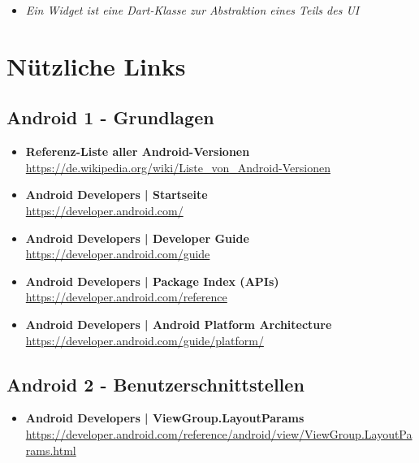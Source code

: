 \documentclass[a4paper]{article}
\begin{document}
{\begin{itemize}
		\item \textit{Ein Widget ist eine Dart-Klasse zur Abstraktion eines Teils des UI}
		
	\end{itemize}
\newpage
	
\section{Nützliche Links}

	\subsection{Android 1 - Grundlagen}
	
	\begin{itemize}
		\item \textbf{Referenz-Liste aller Android-Versionen}\\
		\href{https://de.wikipedia.org/wiki/Liste_von_Android-Versionen}
		{https://de.wikipedia.org/wiki/Liste\_von\_Android-Versionen}
		
		\item \textbf{Android Developers | Startseite}\\
		\href{https://developer.android.com/}
		{https://developer.android.com/}
		
		\item \textbf{Android Developers | Developer Guide}\\
		\href{https://developer.android.com/guide}
		{https://developer.android.com/guide}
		
		\item \textbf{Android Developers | Package Index (APIs)}\\
		\href{https://developer.android.com/reference
		}{https://developer.android.com/reference}
		
		\item \textbf{Android Developers | Android Platform Architecture}\\
		\href{https://developer.android.com/guide/platform/}
		{https://developer.android.com/guide/platform/}
	\end{itemize}
	
	\subsection{Android 2 - Benutzerschnittstellen}
	
	\begin{itemize}
		\item \textbf{Android Developers | ViewGroup.LayoutParams}\\
		\href{https://developer.android.com/reference/android/view/ViewGroup.LayoutParams.html}
		{https://developer.android.com/reference/android/view/ViewGroup.LayoutParams.html}
		

\end{itemize}}
\end{document}

